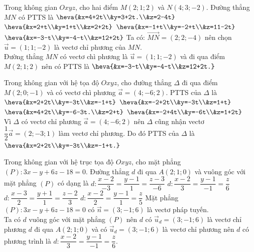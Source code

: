\begin{ex}%
	Trong không gian $O x y z$, cho hai điểm $M(2;1;2)$ và $N(4;3;-2)$. Đường thẳng $MN$ có PTTS là 
	\choice 
	{$\heva{&x=4+2t\\&y=3+2t.\\&z=2-4t}$}
		{$\heva{&x=2+t\\&y=1+t\\&z=2+2t}$}
			{$\heva{&x=-1+t\\&y=-2+t\\&z=11-2t}$}
				{\True $\heva{&x=-3-t\\&y=-4-t\\&z=12+2t}$}
					\loigiai 
					{
	Ta có: $\vec{MN}=(2;2;-4)$ nên chọn $\vec{u}=(1;1;-2)$ là vectơ chỉ phương của $MN$.\\
	Đường thẳng $MN$ có vectơ chì phương là $\vec{u}=(1;1;-2)$ và đi qua điểm $M(2;1;2)$ nên có PTTS là $\heva{&x=-3-t\\&y=-4-t\\&z=12+2t.}$
					}
				\end{ex}
	
\begin{ex}%
	Trong không gian với hệ tọa độ $O x y z$, cho đường thẳng $\Delta$ đi qua điểm $M(2;0;-1)$ và có vectơ chì phương $\vec{a}=(4;-6;2)$. PTTS của $\Delta$ là 
	\choice 
	{\True $\heva{&x=2+2t\\&y=-3t\\&z=-1+t}$}
		{$\heva{&x=-2+2t\\&y=-3t\\&z=1+t}$}
			{$\heva{&x=4+2t\\&y=-6-3t.\\&z=2+t}$}
				{$\heva{&x=-2+4t\\&y=-6t\\&z=1+2t}$}
					\loigiai 
					{
Vì $\Delta$ có vectơ chỉ phương $\vec{a}=(4;-6;2)$ nên $\Delta$ cũng nhận vectơ $\dfrac{1}{2}\vec{a}=(2;-3;1)$ làm vectơ chỉ phương. Do đó PTTS của $\Delta$ là $\heva{&x=2+2t\\&y=-3t\\&z=-1+t.}$
					}
\end{ex}

\begin{ex}%
	Trong không gian với hệ trục tọa độ $O x y z$, cho mặt phẳng $(P)\colon 3x-y+6z-18=0$. Đường thẳng $d$ đi qua $A(2;1;0)$ và vuông góc với mặt phẳng $(P)$ có dạng là 
	\choice 
	{$d\colon\dfrac{x-2}{-3}=\dfrac{y-1}{1}=\dfrac{z-3}{-6}$}
	{\True $d\colon\dfrac{x-2}{3}=\dfrac{y-1}{-1}=\dfrac{z}{6}$}
	{$d\colon\dfrac{x-3}{2}=\dfrac{y+1}{1}=\dfrac{z-2}{3}$}
	{$d\colon\dfrac{x-2}{2}=\dfrac{y-1}{1}=\dfrac{z}{5}$}
	\loigiai 
	{
Mặt phẳng $(P)\colon 3x-y+6z-18=0$ có $\vec{n}=(3;-1;6)$ là vectơ pháp tuyến.\\
Ta có $d$ vuông góc với mặt phẳng $(P)$ nên $d$ có $\vec{u}_d=(3;-1;6)$ là vectơ chỉ phương $d$ đi qua $A(2;1;0)$ và có $\vec{u}_d=(3;-1;6)$ là vectơ chỉ phương nên $d$ có phương trình là $d\colon \dfrac{x-2}{3}=\dfrac{y-1}{-1}=\dfrac{z}{6}$.
	}
\end{ex}

